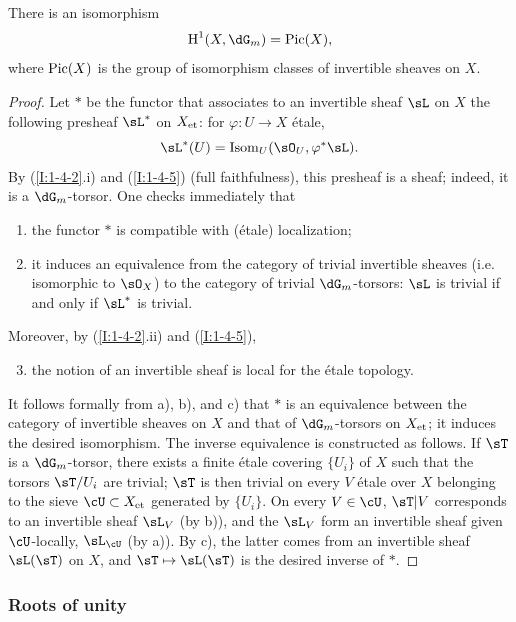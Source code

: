 \begin{proposition}\label{I:2-2-3}
There is an isomorphism
\[
  \h^1(X,\dG_m) = \pic(X)\text{,}
\]
where $\operatorname{Pic}(X)$ is the group of isomorphism classes of invertible sheaves
on $X$.
\end{proposition}
\begin{proof}
Let $*$ be the functor that associates to an invertible sheaf $\sL$ on
$X$ the following presheaf $\sL^*$ on ${X}_{\textnormal{et}}$: for
$\varphi:U\to X$ étale,
\[
  \sL^*(U)=\operatorname{Isom}_U(\sO_U,\varphi^*\sL)\text{.}
\]
By (\ref{I:1-4-2}.i) and (\ref{I:1-4-5}) (full faithfulness), this
presheaf is a sheaf; indeed, it is a $\dG_m$-torsor. One checks
immediately that
\begin{enumerate}[\indent a)]
  \item the functor $*$ is compatible with (étale) localization;
  \item it induces an equivalence from the category of trivial invertible
    sheaves (i.e. isomorphic to $\sO_X$) to the category of trivial
    $\dG_m$-torsors: $\sL$ is trivial if and only if $\sL^*$ is trivial.
\end{enumerate}

Moreover, by (\ref{I:1-4-2}.ii) and (\ref{I:1-4-5}),
\begin{enumerate}[\indent a)]
\setcounter{enumi}{2}
  \item the notion of an invertible sheaf is local for the étale topology.
\end{enumerate}

It follows formally from a), b), and c) that $*$ is an equivalence between
the category of invertible sheaves on $X$ and that of $\dG_m$-torsors on
${X}_{\textnormal{et}}$; it induces the desired isomorphism. The inverse equivalence is
constructed as follows. If $\sT$ is a $\dG_m$-torsor, there exists a
finite étale covering $\{U_i\}$ of $X$ such that the torsors
$\sT/U_i$ are trivial; $\sT$ is then trivial on every $V$ étale over
$X$ belonging to the sieve $\cU\subset\et X$ generated by $\{U_i\}$.
On every $V\in\cU$, $\sT|V$ corresponds to an invertible sheaf $\sL_V$
(by b)), and the $\sL_V$ form an invertible sheaf given $\cU$-locally,
$\sL_\cU$ (by a)). By c), the latter comes from an invertible sheaf
$\sL(\sT)$ on $X$, and $\sT\mapsto\sL(\sT)$ is the desired inverse
of $*$.
\end{proof}

\subsubsection{Roots of unity}\label{I:2-2-4}

